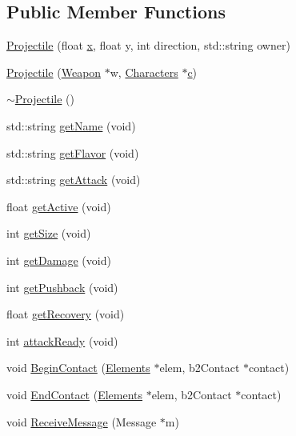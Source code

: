 \subsection*{Public Member Functions}
\begin{DoxyCompactItemize}
\item 
\hyperlink{class_projectile_aa77304b2b631673899c673ea5ff660bd}{Projectile} (float \hyperlink{jquery_8js_a4c3eadaa5164016d2c340d495fc6e55e}{x}, float y, int direction, std\-::string owner)
\item 
\hyperlink{class_projectile_a2131209b192886d9be4fcabe3511a1d3}{Projectile} (\hyperlink{class_weapon}{Weapon} $\ast$w, \hyperlink{class_characters}{Characters} $\ast$\hyperlink{jquery_8js_abce695e0af988ece0826d9ad59b8160d}{c})
\item 
\hyperlink{class_projectile_a94903e021fa2edab60ba3836ca0b937d}{$\sim$\-Projectile} ()
\item 
std\-::string \hyperlink{class_projectile_ace3baa31fb47d65321b3091e55ea0214}{get\-Name} (void)
\item 
std\-::string \hyperlink{class_projectile_a259c762588761610eb08f4590409be47}{get\-Flavor} (void)
\item 
std\-::string \hyperlink{class_projectile_a3d296e98b7227371fdfcfd9fef8bf505}{get\-Attack} (void)
\item 
float \hyperlink{class_projectile_a2342bda48bea3511d0b97f5cba7b095f}{get\-Active} (void)
\item 
int \hyperlink{class_projectile_a284ae1c52821f8a9bd5972793eb210d8}{get\-Size} (void)
\item 
int \hyperlink{class_projectile_ab86af40b130ac18871e9a4baec80dc85}{get\-Damage} (void)
\item 
int \hyperlink{class_projectile_ad54c17a658890109a332e643bb8446f2}{get\-Pushback} (void)
\item 
float \hyperlink{class_projectile_acf9cf10cbb254d444c9b617bd0baf075}{get\-Recovery} (void)
\item 
int \hyperlink{class_projectile_acdc9aa548f9606221bb3fe15e4a7dfa7}{attack\-Ready} (void)
\item 
void \hyperlink{class_projectile_a7347375e9c8cae921709ba56265af0fd}{Begin\-Contact} (\hyperlink{class_elements}{Elements} $\ast$elem, b2\-Contact $\ast$contact)
\item 
void \hyperlink{class_projectile_a9f8fa9403a414fa1fd6ee092720ca4e6}{End\-Contact} (\hyperlink{class_elements}{Elements} $\ast$elem, b2\-Contact $\ast$contact)
\item 
void \hyperlink{class_projectile_aa5247586a6ca84625abed35767b8f282}{Receive\-Message} (Message $\ast$m)
\end{DoxyCompactItemize}
